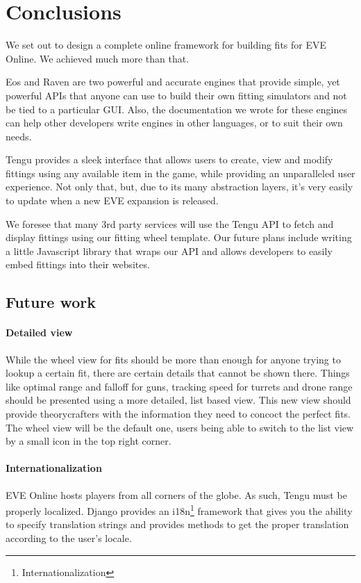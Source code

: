\chapter{Conclusions}
\label{chapter:conclusions}

We set out to design a complete online framework for building fits for EVE Online. We achieved much more than that.

Eos and Raven are two powerful and accurate engines that provide simple, yet powerful APIs that anyone can use to build their own fitting simulators and not be tied to a particular GUI. Also, the documentation we wrote for these engines can help other developers write engines in other languages, or to suit their own needs.

Tengu provides a sleek interface that allows users to create, view and modify fittings using any available item in the game, while providing an unparalleled user experience. Not only that, but, due to its many abstraction layers, it’s very easily to update when a new EVE expansion is released.

We foresee that many 3rd party services will use the Tengu API to fetch and display fittings using our fitting wheel template. Our future plans include writing a little Javascript library that wraps our API and allows developers to easily embed fittings into their websites.

\section{Future work}
\subsubsection{Detailed view}
While the wheel view for fits should be more than enough for anyone trying to lookup a certain fit, there are certain details that cannot be shown there. Things like optimal range and falloff for guns, tracking speed for turrets and drone range should be presented using a more detailed, list based view. This new view should provide theorycrafters with the information they need to concoct the perfect fits. The wheel view will be the default one, users being able to switch to the list view by a small icon in the top right corner.

\subsubsection{Internationalization}
EVE Online hosts players from all corners of the globe. As such, Tengu must be properly localized. Django provides an i18n\footnote{Internationalization} framework that gives you the ability to specify translation strings and provides methods to get the proper translation according to the user’s locale.

